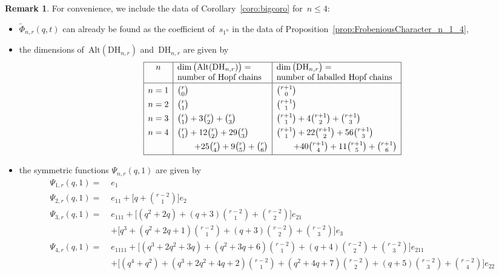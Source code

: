 \documentclass{amsart}
\theoremstyle{definition}
\newtheorem{remark}[theorem]{Remark}
\newcommand{\DiagHarm}[2]{\mathrm{DH}_{#1,#2}} %
\newcommand{\Alt}{\mathrm{Alt}} %
\begin{document}
\begin{remark}
For convenience, we include the data of Corollary~\ref{coro:bigcoro} for~$n \le 4$:
\begin{itemize}
\item $\widetilde \Phi_{n,r}(q,t)$ can already be found as the coefficient of~$s_{1^n}$ in the data of Proposition~\ref{prop:FrobeniousCharacter_n_1_4},
\item the dimensions of~$\Alt(\DiagHarm{n}{r})$ and~$\DiagHarm{n}{r}$ are given by
\[
\begin{array}{|c|l|l|}
\hline
n & \dim \big( \Alt(\DiagHarm{n}{r}) \big) = & \dim \big( \DiagHarm{n}{r} \big) = \\
& \text{number of Hopf chains} & \text{number of laballed Hopf chains}\\
\hline
n=1 & {r \choose 0} & {r+1 \choose 0}\phantom{\Big]}\\[4pt]
n=2 & {r \choose 1} & {r+1 \choose 1} \\[4pt]
n=3 &  {r \choose 1} + 3{r \choose 2} + {r \choose 3} & {r +1\choose 1} + 4{r+1 \choose 2} + {r+1 \choose 3}  \\[4pt]
n=4 &  {r \choose 1} + 12{r \choose 2} + 29{r \choose 3} & {r+1 \choose 1} + 22{r+1 \choose 2} + 56{r+1 \choose 3} \\[4pt]
&\quad\quad +25{r \choose 4} +9{r \choose 5} +{r \choose 6} &\quad\quad + 40{r +1\choose 4} + 11{r+1 \choose 5} +{r+1 \choose 6}  \\[3pt]
\hline
\end{array}
\]
\item the symmetric functions $\Psi_{n,r}(q,1)$ are given by
\begin{align*}
\Psi_{1,r}(q,1) = \; & e_1 \\
\Psi_{2,r}(q,1) = \; & \textstyle e_{11} + \big[{\scriptstyle q}+ {r-2 \choose 1}\big] e_{2} \\[3pt]
\Psi_{3,r}(q,1) = \; & \textstyle e_{111} + \big[({\scriptstyle q^2+2q})+({\scriptstyle q+3}){r -2\choose 1} +{r -2\choose 2}\big] e_{21} \\[3pt] & \textstyle + \big[{\scriptstyle q^3}+({\scriptstyle q^2+2q+1}){r -2\choose 1} + ({\scriptstyle q+3}){r-2 \choose 2} +{r-2 \choose 3}\big] e_{3} \\[3pt]
\Psi_{4,r}(q,1) = \; & \textstyle e_{1111} + \big[({\scriptstyle q^{3} + 2q^{2} + 3q})+({\scriptstyle q^{2} + 3q + 6}){r -2\choose 1} +({\scriptstyle q + 4}){r -2\choose 2}+{r -2\choose 3}\big] e_{211}
	\\[4pt]
 	& \textstyle + \big[({\scriptstyle q^{4} + q^{2}})+({\scriptstyle q^{3} + 2q^{2} + 4q + 2}){r-2\choose 1} +({\scriptstyle q^{2} + 4q + 7}){r -2\choose 2} +({\scriptstyle q + 5}){r-2\choose 3}+{r -2\choose 4}\big] e_{22}

\end{align*}
\end{itemize}
\end{remark}
\end{document}
